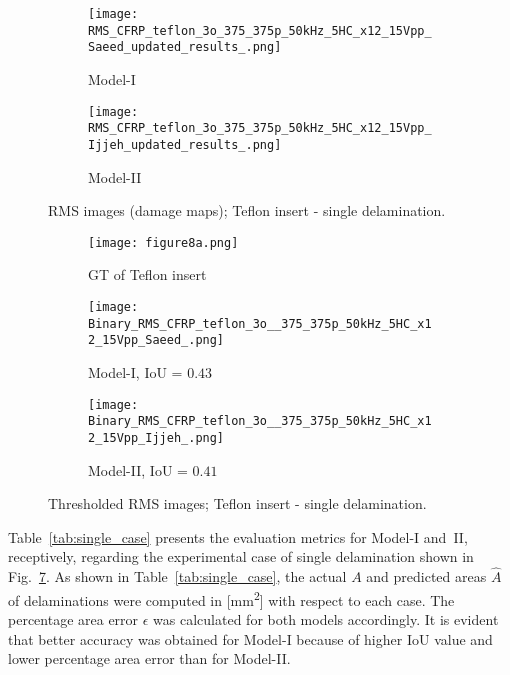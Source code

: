 \begin{sloppypar}
	\begin{figure} [!ht]
		\begin{subfigure}[b]{.48\textwidth}
			\centering
			\texttt{[image: RMS\_CFRP\_teflon\_3o\_375\_375p\_50kHz\_5HC\_x12\_15Vpp\_Saeed\_updated\_results\_.png]}
			\caption{Model-I}
			\label{fig:RMS_CFRP_Teflon_3o_saeed}
		\end{subfigure}
		\hfill
		\begin{subfigure}[b]{.48\textwidth}
			\centering
			\texttt{[image: RMS\_CFRP\_teflon\_3o\_375\_375p\_50kHz\_5HC\_x12\_15Vpp\_Ijjeh\_updated\_results\_.png]}
			\caption{Model-II} 
			\label{fig:RMS_CFRP_Teflon_3o_ijjeh}
		\end{subfigure}
		\caption{RMS images (damage maps); Teflon insert - single delamination.}
		\label{fig:RMS_CFRP_Teflon_3o_images}
	\end{figure} 

	\begin{figure} [!ht]
		\begin{subfigure}[b]{0.32\textwidth}
			\centering
			\texttt{[image: figure8a.png]}
			\caption{GT of Teflon insert}
			\label{fig:exp_CFRP_teflon_3o_GT}
		\end{subfigure}
		\hfill
		\begin{subfigure}[b]{.32\textwidth}
			\centering
			\texttt{[image: Binary\_RMS\_CFRP\_teflon\_3o\_\_375\_375p\_50kHz\_5HC\_x12\_15Vpp\_Saeed\_.png]}
			\caption{Model-I, IoU = \(0.43\)}
			\label{fig:RMS_threshold_CFRP_Teflon_3o_saeed}
		\end{subfigure}
		\hfill
		\begin{subfigure}[b]{.32\textwidth}
			\centering
			\texttt{[image: Binary\_RMS\_CFRP\_teflon\_3o\_\_375\_375p\_50kHz\_5HC\_x12\_15Vpp\_Ijjeh\_.png]}
			\caption{Model-II, IoU = \(0.41\)} 
			\label{fig:RMS_threshold_CFRP_Teflon_3o_ijjeh}
		\end{subfigure}
		\caption{Thresholded RMS images; Teflon insert - single delamination.}
		\label{fig:RMS_threshold_CFRP_Teflon_3o_images}
	\end{figure} 
	
	Table~\ref{tab:single_case} presents the evaluation metrics for Model-I and~II, receptively, regarding the experimental case of single delamination shown in Fig.~\ref{fig:RMS_threshold_CFRP_Teflon_3o_images}.
	As shown in Table~\ref{tab:single_case}, the actual \(A\) and predicted areas \(\hat{A}\) of delaminations were computed in [mm\textsuperscript{2}] with respect to each case. 
	The percentage area error \(\epsilon\) was calculated for both models accordingly.
	It is evident that better accuracy was obtained for Model-I because of higher IoU value and lower percentage area error than for Model-II. 
	

\end{sloppypar}
